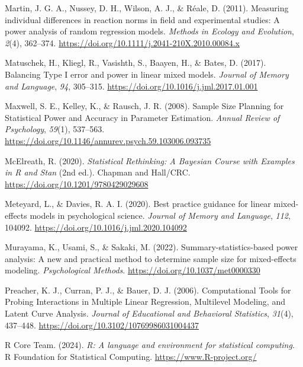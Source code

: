 \documentclass[
  man,
  floatsintext,
  longtable,
  a4paper,
  nolmodern,
  notxfonts,
  notimes,
  colorlinks=true,linkcolor=blue,citecolor=blue,urlcolor=blue]{apa7}
\newlength{\cslhangindent}
\newenvironment{CSLReferences}[2] %
 {\begin{list}{}{%
  \setlength{\itemindent}{0pt}
  \setlength{\leftmargin}{0pt}
  \setlength{\parsep}{0pt}
  \ifodd #1
   \setlength{\leftmargin}{\cslhangindent}
   \setlength{\itemindent}{-1\cslhangindent}
  \fi
  \setlength{\itemsep}{#2\baselineskip}}}
 {\end{list}}
\begin{document}
\begin{CSLReferences}{1}{0}
Martin, J. G. A., Nussey, D. H., Wilson, A. J., \& Réale, D. (2011).
Measuring individual differences in reaction norms in field and
experimental studies: A power analysis of random regression models.
\emph{Methods in Ecology and Evolution}, \emph{2}(4), 362--374.
\url{https://doi.org/10.1111/j.2041-210X.2010.00084.x}

Matuschek, H., Kliegl, R., Vasishth, S., Baayen, H., \& Bates, D.
(2017). Balancing {Type I} error and power in linear mixed models.
\emph{Journal of Memory and Language}, \emph{94}, 305--315.
\url{https://doi.org/10.1016/j.jml.2017.01.001}

Maxwell, S. E., Kelley, K., \& Rausch, J. R. (2008). Sample {Size
Planning} for {Statistical Power} and {Accuracy} in {Parameter
Estimation}. \emph{Annual Review of Psychology}, \emph{59}(1), 537--563.
\url{https://doi.org/10.1146/annurev.psych.59.103006.093735}

McElreath, R. (2020). \emph{Statistical {Rethinking}: {A Bayesian
Course} with {Examples} in {R} and {Stan}} (2nd ed.). {Chapman and
Hall/CRC}. \url{https://doi.org/10.1201/9780429029608}

Meteyard, L., \& Davies, R. A. I. (2020). Best practice guidance for
linear mixed-effects models in psychological science. \emph{Journal of
Memory and Language}, \emph{112}, 104092.
\url{https://doi.org/10.1016/j.jml.2020.104092}

Murayama, K., Usami, S., \& Sakaki, M. (2022). Summary-statistics-based
power analysis: {A} new and practical method to determine sample size
for mixed-effects modeling. \emph{Psychological Methods}.
\url{https://doi.org/10.1037/met0000330}

Preacher, K. J., Curran, P. J., \& Bauer, D. J. (2006). Computational
{Tools} for {Probing Interactions} in {Multiple Linear Regression},
{Multilevel Modeling}, and {Latent Curve Analysis}. \emph{Journal of
Educational and Behavioral Statistics}, \emph{31}(4), 437--448.
\url{https://doi.org/10.3102/10769986031004437}

R Core Team. (2024). \emph{R: A language and environment for statistical
computing}. R Foundation for Statistical Computing.
\url{https://www.R-project.org/}


\end{CSLReferences}
\end{document}

